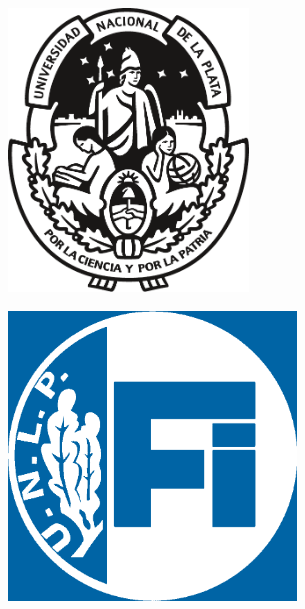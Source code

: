 \begin{titlepage}
\begin{center}
            \\
            \vfill
            \begin{figure}[H]
                \centering
                \begin{subfigure}{0.3\textwidth}
                    \centering
                    \includegraphics[width=0.7\textwidth]{Imagenes/UNLP.pdf}
                \end{subfigure}
                \hspace{2em}
                \begin{subfigure}{0.3\textwidth}
                    \centering
                    \includegraphics[width=0.84\textwidth]{Imagenes/FI Invertido.png}

\end{subfigure}
\end{figure}
\end{center}
\end{titlepage}
